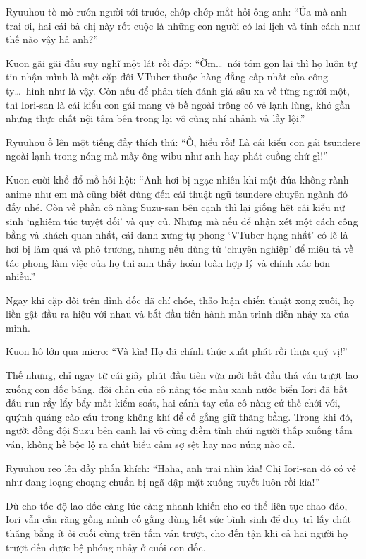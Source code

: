 \documentclass[../main.tex]{subfiles}
\begin{document}
Ryuuhou tò mò rướn người tới trước, chớp chớp mắt hỏi ông anh: ``Ủa mà anh trai ơi, hai cái bà chị này rốt cuộc là những con người có lai lịch và tính cách như thế nào vậy hả anh?''

Kuon gãi gãi đầu suy nghĩ một lát rồi đáp: ``Ờm\dots\ nói tóm gọn lại thì họ luôn tự tin nhận mình là một cặp đôi VTuber thuộc hàng đẳng cấp nhất của công ty\dots\ hình như là vậy. Còn nếu để phân tích đánh giá sâu xa về từng người một, thì Iori-san là cái kiểu con gái mang vẻ bề ngoài trông có vẻ lạnh lùng, khó gần nhưng thực chất nội tâm bên trong lại vô cùng nhí nhảnh và lầy lội.''

Ryuuhou ồ lên một tiếng đầy thích thú: ``Ồ, hiểu rồi! Là cái kiểu con gái tsundere ngoài lạnh trong nóng mà mấy ông wibu như anh hay phát cuồng chứ gì!''

Kuon cười khổ đổ mồ hôi hột: ``Anh hơi bị ngạc nhiên khi một đứa không rành anime như em mà cũng biết dùng đến cái thuật ngữ tsundere chuyên ngành đó đấy nhé. Còn về phần cô nàng Suzu-san bên cạnh thì lại giống hệt cái kiểu nữ sinh `nghiêm túc tuyệt đối' và quy củ. Nhưng mà nếu để nhận xét một cách công bằng và khách quan nhất, cái danh xưng tự phong `VTuber hạng nhất' có lẽ là hơi bị làm quá và phô trương, nhưng nếu dùng từ `chuyên nghiệp' để miêu tả về tác phong làm việc của họ thì anh thấy hoàn toàn hợp lý và chính xác hơn nhiều.''

Ngay khi cặp đôi trên đỉnh dốc đã chí chóe, thảo luận chiến thuật xong xuôi, họ liền gật đầu ra hiệu với nhau và bắt đầu tiến hành màn trình diễn nhảy xa của mình.

Kuon hô lớn qua micro: ``Và kìa! Họ đã chính thức xuất phát rồi thưa quý vị!''

Thế nhưng, chỉ ngay từ cái giây phút đầu tiên vừa mới bắt đầu thả ván trượt lao xuống con dốc băng, đôi chân của cô nàng tóc màu xanh nước biển Iori đã bắt đầu run rẩy lẩy bẩy mất kiểm soát, hai cánh tay của cô nàng cứ thế chới với, quýnh quáng cào cấu trong không khí để cố gắng giữ thăng bằng. Trong khi đó, người đồng đội Suzu bên cạnh lại vô cùng điềm tĩnh chúi người thấp xuống tấm ván, không hề bộc lộ ra chút biểu cảm sợ sệt hay nao núng nào cả.

Ryuuhou reo lên đầy phấn khích: ``Haha, anh trai nhìn kìa! Chị Iori-san đó có vẻ như đang loạng choạng chuẩn bị ngã dập mặt xuống tuyết luôn rồi kìa!''

Dù cho tốc độ lao dốc càng lúc càng nhanh khiến cho cơ thể liên tục chao đảo, Iori vẫn cắn răng gồng mình cố gắng dùng hết sức bình sinh để duy trì lấy chút thăng bằng ít ỏi cuối cùng trên tấm ván trượt, cho đến tận khi cả hai người họ trượt đến được bệ phóng nhảy ở cuối con dốc.
\end{document}
